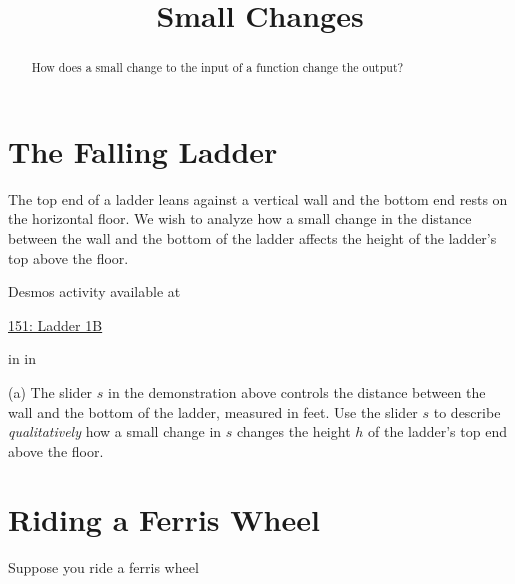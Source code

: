 \documentclass{ximera}
\title{Small Changes}
\newcommand{\pskip}{\vskip 0.1 in}
\begin{document}
\begin{abstract}
How does a small change to the input of a function change the output?
\end{abstract}
\maketitle


\section{The Falling Ladder}


\begin{example}   \label{Ex435rsfeetr}

The top end of a ladder leans against a vertical wall and the bottom end rests on the horizontal floor. We wish to analyze how a small change in the distance between the wall and the bottom of the ladder affects the height of the ladder's top above the floor. 

 
\begin{onlineOnly}
    \begin{center}
\end{center}
\end{onlineOnly}

Desmos activity available at

\href{https://www.desmos.com/calculator/6at8gegn2b}{151: Ladder 1B}

\pskip \pskip

\begin{question}  \label{Qdsfesarr4}

(a) The slider $s$ in the demonstration above controls the distance between the wall and the bottom of the ladder, measured in feet. Use the slider $s$ to describe \emph{qualitatively} how a small change in $s$ changes the height $h$ of the ladder's top end above the floor.


\end{question}


\end{example}


\section{Riding a Ferris Wheel}


Suppose  you ride a ferris wheel
\end{document}
